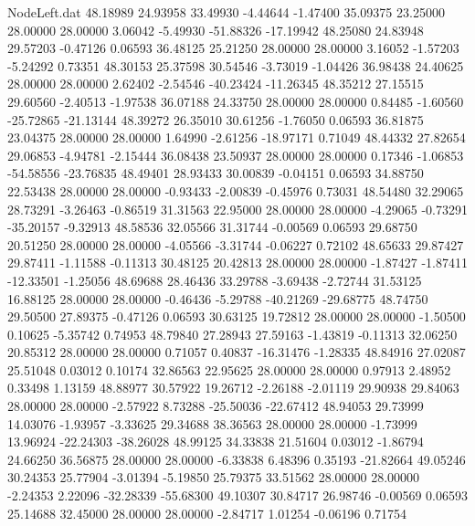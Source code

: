 \begin{filecontents}{NodeLeft.dat}
  48.18989   24.93958   33.49930    -4.44644   -1.47400   35.09375   23.25000   28.00000   28.00000    3.06042   -5.49930  -51.88326  -17.19942
  48.25080   24.83948   29.57203    -0.47126    0.06593   36.48125   25.21250   28.00000   28.00000    3.16052   -1.57203   -5.24292    0.73351
  48.30153   25.37598   30.54546    -3.73019   -1.04426   36.98438   24.40625   28.00000   28.00000    2.62402   -2.54546  -40.23424  -11.26345
  48.35212   27.15515   29.60560    -2.40513   -1.97538   36.07188   24.33750   28.00000   28.00000    0.84485   -1.60560  -25.72865  -21.13144
  48.39272   26.35010   30.61256    -1.76050    0.06593   36.81875   23.04375   28.00000   28.00000    1.64990   -2.61256  -18.97171    0.71049
  48.44332   27.82654   29.06853    -4.94781   -2.15444   36.08438   23.50937   28.00000   28.00000    0.17346   -1.06853  -54.58556  -23.76835
  48.49401   28.93433   30.00839    -0.04151    0.06593   34.88750   22.53438   28.00000   28.00000   -0.93433   -2.00839   -0.45976    0.73031
  48.54480   32.29065   28.73291    -3.26463   -0.86519   31.31563   22.95000   28.00000   28.00000   -4.29065   -0.73291  -35.20157   -9.32913
  48.58536   32.05566   31.31744    -0.00569    0.06593   29.68750   20.51250   28.00000   28.00000   -4.05566   -3.31744   -0.06227    0.72102
  48.65633   29.87427   29.87411    -1.11588   -0.11313   30.48125   20.42813   28.00000   28.00000   -1.87427   -1.87411  -12.33501   -1.25056
  48.69688   28.46436   33.29788    -3.69438   -2.72744   31.53125   16.88125   28.00000   28.00000   -0.46436   -5.29788  -40.21269  -29.68775
  48.74750   29.50500   27.89375    -0.47126    0.06593   30.63125   19.72812   28.00000   28.00000   -1.50500    0.10625   -5.35742    0.74953
  48.79840   27.28943   27.59163    -1.43819   -0.11313   32.06250   20.85312   28.00000   28.00000    0.71057    0.40837  -16.31476   -1.28335
  48.84916   27.02087   25.51048     0.03012    0.10174   32.86563   22.95625   28.00000   28.00000    0.97913    2.48952    0.33498    1.13159
  48.88977   30.57922   19.26712    -2.26188   -2.01119   29.90938   29.84063   28.00000   28.00000   -2.57922    8.73288  -25.50036  -22.67412
  48.94053   29.73999   14.03076    -1.93957   -3.33625   29.34688   38.36563   28.00000   28.00000   -1.73999   13.96924  -22.24303  -38.26028
  48.99125   34.33838   21.51604     0.03012   -1.86794   24.66250   36.56875   28.00000   28.00000   -6.33838    6.48396    0.35193  -21.82664
  49.05246   30.24353   25.77904    -3.01394   -5.19850   25.79375   33.51562   28.00000   28.00000   -2.24353    2.22096  -32.28339  -55.68300
  49.10307   30.84717   26.98746    -0.00569    0.06593   25.14688   32.45000   28.00000   28.00000   -2.84717    1.01254   -0.06196    0.71754

\end{filecontents}
